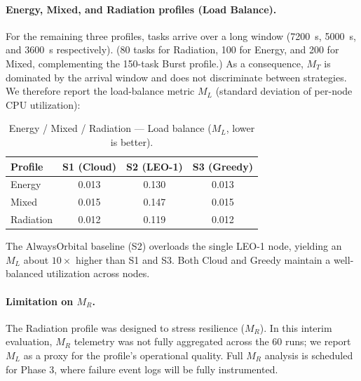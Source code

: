 \documentclass[conference]{IEEEtran}
\begin{document}
\paragraph{Energy, Mixed, and Radiation profiles (Load Balance).}
For the remaining three profiles, tasks arrive over a long window (7200~s, 5000~s, and 3600~s respectively). (80 tasks for Radiation, 100 for Energy, and 200 for Mixed, complementing the 150-task Burst profile.) As a consequence, $M_T$ is dominated by the arrival window and does not discriminate between strategies. We therefore report the load-balance metric $M_L$ (standard deviation of per-node CPU utilization):

\begin{table}[h!]
\centering
\caption{Energy / Mixed / Radiation --- Load balance ($M_L$, lower is better).}
\begin{tabular}{l c c c}
\toprule
\textbf{Profile} & \textbf{S1 (Cloud)} & \textbf{S2 (LEO-1)} & \textbf{S3 (Greedy)} \\
\midrule
Energy    & 0.013 & 0.130 & 0.013 \\
Mixed     & 0.015 & 0.147 & 0.015 \\
Radiation & 0.012 & 0.119 & 0.012 \\
\bottomrule
\end{tabular}
\label{tab:loadbalance}
\end{table}

The AlwaysOrbital baseline (S2) overloads the single LEO-1 node, yielding an $M_L$ about $10\times$ higher than S1 and S3. Both Cloud and Greedy maintain a well-balanced utilization across nodes.

\paragraph{Limitation on $M_R$.}
The Radiation profile was designed to stress resilience ($M_R$). In this interim evaluation, $M_R$ telemetry was not fully aggregated across the 60 runs; we report $M_L$ as a proxy for the profile's operational quality. Full $M_R$ analysis is scheduled for Phase 3, where failure event logs will be fully instrumented.
\end{document}
